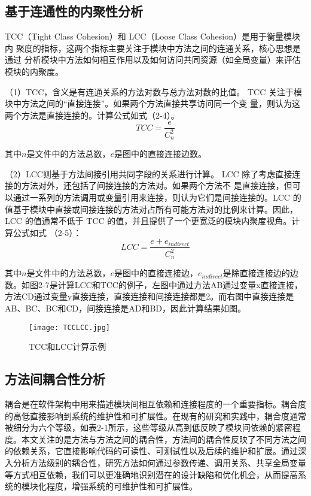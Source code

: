 \subsection{基于连通性的内聚性分析}
TCC（Tight Class Cohesion）和 LCC（Loose Class Cohesion）是用于衡量模块内
聚度的指标，这两个指标主要关注于模块中方法之间的连通关系，核心思想是通过
分析模块中方法如何相互作用以及如何访问共同资源（如全局变量）来评估模块的内聚度。


（1）TCC，含义是有连通关系的方法对数与总方法对数的比值\cite{1995Cohesion}。
TCC 关注于模块中方法之间的“直接连接”。如果两个方法直接共享访问同一个变
量，则认为这两个方法是直接连接的。计算公式如式（2-4）。
\begin{equation}
{TCC} = \frac{e}{C_{n}^{2}}
\end{equation}

其中\(n\)是文件中的方法总数，\(e\)是图中的直接连接边数。

（2）LCC则基于方法间接引用共同字段的关系进行计算\cite{1995Cohesion}。
LCC 除了考虑直接连接的方法对外，还包括了间接连接的方法对。如果两个方法不
是直接连接，但可以通过一系列的方法调用或变量引用来连接，则认为它们是间接连接的。LCC 的值基于模块中直接或间接连接的方法对占所有可能方法对的比例来计算。因此，LCC 的值通常不低于 TCC 的值，并且提供了一个更宽泛的模块内聚度视角。计算公式如式 （2-5）：
\begin{equation}
{LCC=\frac{e+e_{indirect}}{C_{n}^{2}}}
\end{equation}

其中\(n\)是文件中的方法总数，\(e\)是图中的直接连接边，\(e_{indirect}\)是除直接连接边的边数。如图2-7是计算LCC和TCC的例子，左图中通过方法AB通过变量x直接连接，方法CD通过变量y直接连接，直接连接和间接连接都是2。而右图中直接连接是AB、BC、BC和CD，间接连接是AD和BD，因此计算结果如图。

\begin{figure}[h]
\centering
\texttt{[image: TCCLCC.jpg]}
\caption{TCC和LCC计算示例}
\end{figure}


\subsection{方法间耦合性分析}

耦合是在软件架构中用来描述模块间相互依赖和连接程度的一个重要指标。耦合度的高低直接影响到系统的维护性和可扩展性。在现有的研究和实践中，耦合度通常被细分为六个等级，如表2-1所示，这些等级从高到低反映了模块间依赖的紧密程度。本文关注的是方法与方法之间的耦合性，方法间的耦合性反映了不同方法之间的依赖关系，它直接影响代码的可读性、可测试性以及后续的维护和扩展。通过深入分析方法级别的耦合性，研究方法如何通过参数传递、调用关系、共享全局变量等方式相互依赖，我们可以更准确地识别潜在的设计缺陷和优化机会，从而提高系统的模块化程度，增强系统的可维护性和可扩展性。


